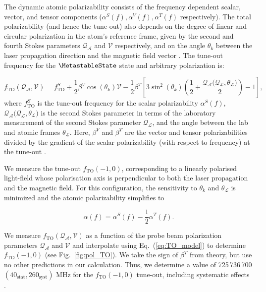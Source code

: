 	The dynamic atomic polarizability consists of the frequency dependent scalar, vector, and tensor components (\(\alpha^S(f),\alpha^V(f),\alpha^T(f)\) respectively). The total polarizability (and hence the tune-out) also depends on the degree of linear and circular polarization in the atom's reference frame, given by the second and fourth Stokes parameters \(\mathcal{Q_{A}}\) and  \(\mathcal{V}\) respectively, and on the angle $\theta_k$ between the laser propagation direction and the magnetic field vector \cite{LeKien13}. The tune-out frequency for the \(\MetastableState\) state and arbitrary polarization is: 

	    \begin{equation}
	    f_{\mathrm{TO}}(\mathcal{Q_{A}}, \mathcal{V}) = f^{S}_{\mathrm{TO}} + \frac{1}{2} \beta^V \cos \left( \theta_k \right) \mathcal{V}  - \frac{1}{2} \beta^T \left[3 \sin^2\left( \theta_k \right) \left(\frac{1}{2} +  \frac{\mathcal{Q_{A}(Q_{L},\theta_{L}})}{2}\right) -1 \right],
	    \label{eq:TO_model}
	    \end{equation}
	where \(f^{S}_{\mathrm{TO}}\) is the tune-out frequency for the scalar polarizability $\alpha^S(f)$, \(\mathcal{Q_{A}(Q_{L},\theta_{L}})\) is the second Stokes parameter in terms of the laboratory measurement of the second Stokes parameter \(\mathcal{Q_L}\), and the angle between the lab and atomic frames \(\mathcal{\theta_{L}}\). Here, \( \beta^V\) and  \(\beta^T\) are the vector and tensor polarizabilities divided by the gradient of the scalar polarizability (with respect to frequency) at the tune-out \cite{ArxivTO}.


	We measure the tune-out \(f_{\mathrm{TO}}(-1,0)\), corresponding to a linearly polarised light-field whose polarisation axis is perpendicular to both the laser propagation and the magnetic field. For this configuration, the sensitivity to \(\theta_{k}\) and \(\theta_\mathcal{L}\) is minimized and the atomic polarizability simplifies to

	\begin{equation}
	    \alpha(f) = \alpha^S(f) - \frac{1}{2} \alpha^T(f). 
	    \label{eq:polarizability_2}
	\end{equation}

	We measure \(f_{\mathrm{TO}}(\mathcal{Q_{A}}, \mathcal{V}) \) as a function of the probe beam polarization parameters \(\mathcal{Q_{A}}\) and \(\mathcal{V}\) and interpolate using Eq.~(\ref{eq:TO_model}) to determine \(f_{\mathrm{TO}}(-1,0)\) (see Fig.~\ref{fig:pol_TO}). We take the sign of \(\beta^T\) from theory, but use no other predictions in our calculation. Thus, we determine a value of  725\,736\,700\,$(40_{\mathrm{stat}},260_{\mathrm{syst}})$ MHz for the \(f_{\mathrm{TO}}(-1,0)\) tune-out, including systematic effects \cite{ArxivTO}.

